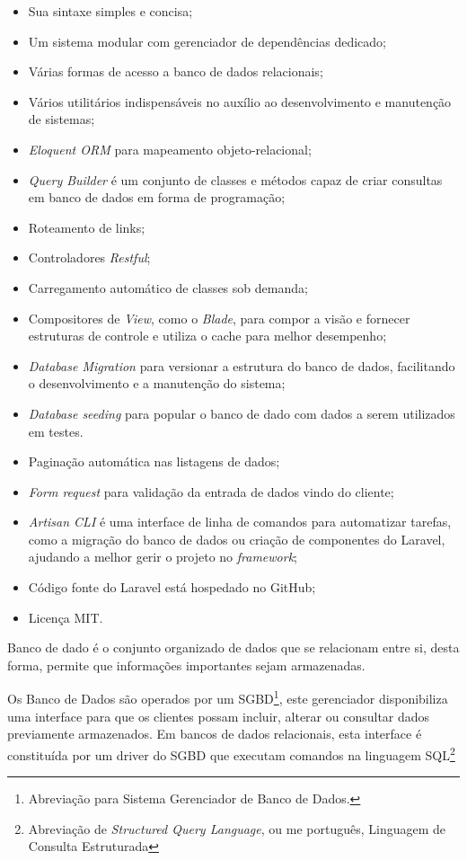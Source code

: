 \documentclass[
  12pt,				%
  openany,
  oneside,
  a4paper,			%
  english,			%
  brazil
]{article}
\numberwithin{figure}{section}
\numberwithin{table}{section}
\newcounter{subsubsubsection}[subsubsection]
\begin{document}
{\singlespacing
\begin{itemize}
  \item Sua sintaxe simples e concisa;
  \item Um sistema modular com gerenciador de dependências dedicado;
  \item Várias formas de acesso a banco de dados relacionais;
  \item Vários utilitários indispensáveis no auxílio ao desenvolvimento e manutenção de sistemas;
  \item \textit{Eloquent ORM} para mapeamento objeto-relacional;
  \item \textit{Query Builder} é um conjunto de classes e métodos capaz de criar consultas em banco de dados em forma de programação;
  \item Roteamento de links;
  \item Controladores \textit{Restful};
  \item Carregamento automático de classes sob demanda;
  \item Compositores de \textit{View}, como o \textit{Blade}, para compor a visão e fornecer estruturas de controle e utiliza o cache para melhor desempenho;
  \item \textit{Database Migration} para versionar a estrutura do banco de dados, facilitando o desenvolvimento e a manutenção do sistema;
  \item \textit{Database seeding} para popular o banco de dado com dados a serem utilizados em testes.
  \item Paginação automática nas listagens de dados;
  \item \textit{Form request} para validação da entrada de dados vindo do cliente;
  \item \textit{Artisan CLI} é uma interface de linha de comandos para automatizar tarefas, como a migração do banco de dados ou criação de componentes do Laravel, ajudando a melhor gerir o projeto no \textit{framework};
  \item Código fonte do Laravel está hospedado no GitHub;
  \item Licença MIT.
\end{itemize}
}


Banco de dado é o conjunto organizado de dados que se relacionam entre si, desta forma, permite que informações importantes sejam armazenadas. 

Os Banco de Dados são operados por um SGBD\footnote{Abreviação para Sistema Gerenciador de Banco de Dados.}, este gerenciador disponibiliza uma interface para que os clientes possam incluir, alterar ou consultar dados previamente armazenados. Em bancos de dados relacionais, esta interface é constituída por um driver do SGBD que executam comandos na linguagem SQL\footnote{Abreviação de \textit{Structured Query Language}, ou me português, Linguagem de Consulta Estruturada}
\end{document}
